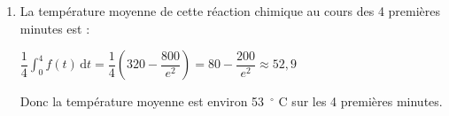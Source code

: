 \begin{enumerate}
\begin{enumerate}
On pose $u(t) = 60 t + 40$ et $v'(t) = e^{-0{,}5 t}$ alors $u'(t)=60$ et $v(t)= -2 e^{-0{,}5 t}$.

les fonctions $u$ et $v$ sont dérivables et leurs fonctions dérivées sont continues donc d'après la formules d'intégration par parties :

$ \displaystyle\int_0^4 (60 t + 40) e^{-0{,}5t} \text{d}t  = \left[ (60 t + 40)(-2 e^{-0{,}5t}) \right]_0^4 - \int_0^4 -2 \times 60 e^{-0{,}5t} \text{d}t = \left[(-120t -80) e^{-0{,}5t}\right]_0^4 + 120 \int_0^4 e^{-0{,}5t} \text{d}t$

$= -560e^{-2} +80 + 120 \left[-2 e^{-0{,}5t}\right]_0^4  =-560e^{-2}  +80+ 120 (-2 e^{-2} + 2)  = -560 e^{-2} + 80  -240 e^{-2} + 240$

$= 320 - 800 e^{-2} = 320 -\dfrac{800}{\mathrm{e}^{2}}$.

		\item La température moyenne de cette réaction chimique au cours des 4 premières minutes est :

$\dfrac{1}{4}\displaystyle \int_0^4 f(t)\,\text{d}t =\dfrac{1}{4} \left(320 - \dfrac{800}{e^2} \right) = 80 - \dfrac{200}{e^2} \approx  52,9$

Donc la température moyenne est environ 53~\ensuremath{^\circ} C sur les 4 premières minutes.
	\end{enumerate}
\end{enumerate}
